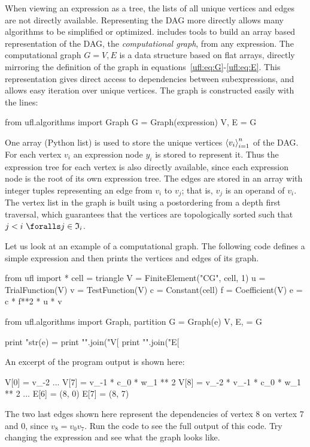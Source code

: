When viewing an expression as a tree, the lists of all unique
vertices and edges are not directly available. Representing the DAG
more directly allows many algorithms to be simplified or optimized.
\ufl{} includes tools to build an array based representation of
the DAG, the \emph{computational graph}, from any expression.
The computational graph $G = V, E$ is a data structure based on
flat arrays, directly mirroring the definition of the graph in
equations~\eqref{ufl:eq:G}-\eqref{ufl:eq:E}.  This representation gives
direct access to dependencies between subexpressions, and allows easy
iteration over unique vertices.  The graph is constructed easily with
the lines:
\begin{python}
from ufl.algorithms import Graph
G = Graph(expression)
V, E = G
\end{python}
One array (Python list)
 is used to store the unique vertices $\left\langle{v_i}\right\rangle_{i=1}^n$ of the
DAG.  For each vertex $v_i$ an expression node $y_i$ is stored to
represent it.  Thus the expression tree for each vertex is also
directly available, since each expression node is the root of its own
expression tree. The edges are stored in an array  with
integer tuples  representing an edge from $v_i$ to $v_j$;
that is, $v_j$ is an operand of $v_i$.  The vertex list in the graph
is built using a postordering from a depth first traversal,
which guarantees that the vertices are topologically sorted
such that $j < i \,\, \foralls j \in \mI_i$.

Let us look at an example of a computational graph. The following code
defines a simple expression and then prints the vertices and edges
of its graph.
\begin{python}
from ufl import *
cell = triangle
V = FiniteElement("CG", cell, 1)
u = TrialFunction(V)
v = TestFunction(V)
c = Constant(cell)
f = Coefficient(V)
e = c * f**2 * u * v

from ufl.algorithms import Graph, partition
G = Graph(e)
V, E, = G

print "str(e) = %
print "\n".join("V[%
print "\n".join("E[%
\end{python}
An excerpt of the program output is shown here:
\begin{gencode}
V[0] = v_{-2}
...
V[7] = v_{-1} * c_0 * w_1 ** 2
V[8] = v_{-2} * v_{-1} * c_0 * w_1 ** 2
...
E[6] = (8, 0)
E[7] = (8, 7)
\end{gencode}
The two last edges shown here represent the dependencies of vertex 8
on vertex 7 and 0, since $v_8 = v_0 v_7$. Run the code to see the full
output of this code.  Try changing the expression and see what the
graph looks like.

